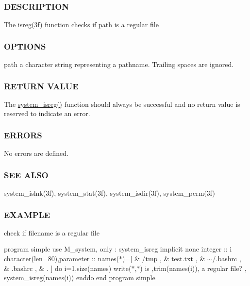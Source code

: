 \subsubsection*{D\+E\+S\+C\+R\+I\+P\+T\+I\+ON}

The isreg(3f) function checks if path is a regular file

\subsubsection*{O\+P\+T\+I\+O\+NS}

path a character string representing a pathname. Trailing spaces are ignored.

\subsubsection*{R\+E\+T\+U\+RN V\+A\+L\+UE}

The \mbox{\hyperlink{namespacem__system_a8ea0d0430227af61b8083b4e7d6e597d}{system\+\_\+isreg()}} function should always be successful and no return value is reserved to indicate an error.

\subsubsection*{E\+R\+R\+O\+RS}

No errors are defined.

\subsubsection*{S\+EE A\+L\+SO}

system\+\_\+islnk(3f), system\+\_\+stat(3f), system\+\_\+isdir(3f), system\+\_\+perm(3f)

\subsubsection*{E\+X\+A\+M\+P\+LE}

check if filename is a regular file

program simple use M\+\_\+system, only \+: system\+\_\+isreg implicit none integer \+:\+: i character(len=80),parameter \+:\+: names($\ast$)=\mbox{[} \& \textquotesingle{}/tmp \textquotesingle{}, \& \textquotesingle{}test.\+txt \textquotesingle{}, \& \textquotesingle{}$\sim$/.bashrc \textquotesingle{}, \& \textquotesingle{}.bashrc \textquotesingle{}, \& \textquotesingle{}. \textquotesingle{}\mbox{]} do i=1,size(names) write($\ast$,$\ast$)\textquotesingle{} is \textquotesingle{},trim(names(i)),\textquotesingle{} a regular file? \textquotesingle{}, system\+\_\+isreg(names(i)) enddo end program simple

